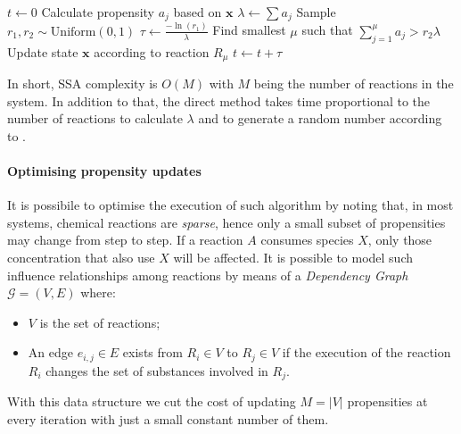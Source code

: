 \begin{algorithm}
	\caption{Stochastic Simulation Algorithm (Direct Method)}\label{alg:ssa}
	\begin{algorithmic}[1]
		\State $t \gets 0$
		\State Calculate propensity $a_j$ based on $\mathbf{x}$
		\EndFor
		\State $\lambda \gets \sum a_j$
		\State Sample $r_1, r_2 \sim \text{Uniform}(0, 1)$
		\State $\tau \gets \frac{-\ln(r_1)}{\lambda}$ 
		\State Find smallest $\mu$ such that $\sum_{j=1}^{\mu} a_j > r_2 \lambda$ 
		\State Update state $\mathbf{x}$ according to reaction $R_\mu$
		\State $t \gets t + \tau$
		\EndWhile
		\EndProcedure
	\end{algorithmic}
\end{algorithm}

In short, \ac{SSA} complexity is $O(M)$ with $M$ being the number of reactions
in the system. In addition to that, the direct method takes time proportional
to the number of reactions to calculate $\lambda$ and to generate a random number
according to .

\paragraph{Optimising propensity updates}
It is possibile to optimise the execution of such algorithm by noting that,
in most systems, chemical reactions are \emph{sparse}, hence only a small
subset of propensities may change from step to step. If a reaction
$A$ consumes species $X$, only those concentration that also use $X$ will be
affected. It is possible to model such influence relationships among reactions
by means of a \emph{Dependency Graph} $\mathcal{G} = (V, E)$ where:
\begin{itemize}
	\item $V$ is the set of reactions;
	\item An edge $e_{i,j} \in E$ exists from $R_i \in V$ to $R_j \in V$ if the
	      execution of the reaction $R_i$ changes the set of substances involved
	      in $R_j$.
\end{itemize}
With this data structure we cut the cost of updating $M = |V|$ propensities at
every iteration with just a small constant number of them.

